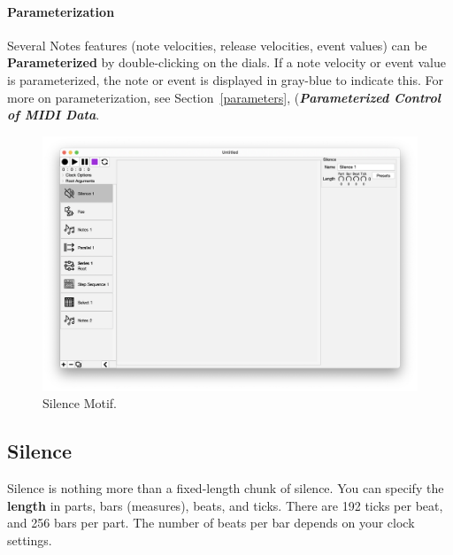 \documentclass[twoside,10pt]{article}
\begin{document}
\paragraph{Parameterization}

Several Notes features (note velocities, release velocities, event values) can be {\bf Parameterized} by double-clicking on the dials.  If a note velocity or event value is parameterized, the note or event is displayed in gray-blue to indicate this.  For more on parameterization, see Section~\ref{parameters}, (\textbf{\textit{Parameterized Control of MIDI Data}}.

\clearpage

\begin{figure}[t]
\centering
\includegraphics[width=6.5in]{Silence}
\vspace{-2em}
\caption{Silence Motif.}
\label{silence}
\end{figure}

\subsection{Silence}

Silence is nothing more than a fixed-length chunk of silence.    You can specify the {\bf length} in parts, bars (measures), beats, and ticks.  There are 192 ticks per beat, and 256 bars per part.  The number of beats per bar depends on your clock settings.

\clearpage
\end{document}

